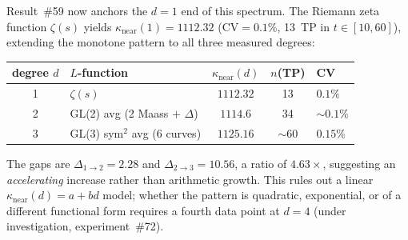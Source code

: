 \documentclass[11pt, a4paper]{article}
\theoremstyle{definition}
\theoremstyle{plain}
\begin{document}
Result~\#59 now anchors the $d{=}1$ end of this spectrum.
The Riemann zeta function $\zeta(s)$ yields $\kappa_{\mathrm{near}}(1) = 1112.32$
(CV${=}0.1\%$, 13~TP in $t \in [10,60]$), extending the monotone pattern to all
three measured degrees:

\smallskip
\begin{center}
\small
\begin{tabular}{clccl}
\toprule
degree $d$ & $L$-function & $\kappa_{\mathrm{near}}(d)$ & $n$(TP) & CV \\
\midrule
1 & $\zeta(s)$ & $1112.32$ & 13 & $0.1\%$ \\
2 & GL(2) avg (2 Maass $+$ $\Delta$) & $1114.6$ & 34 & ${\sim}0.1\%$ \\
3 & GL(3) sym$^2$ avg (6 curves) & $1125.16$ & ${\sim}60$ & $0.15\%$ \\
\bottomrule
\end{tabular}
\end{center}
\smallskip

\noindent
The gaps are $\Delta_{1\to2} = 2.28$ and $\Delta_{2\to3} = 10.56$, a ratio of $4.63\times$,
suggesting an \emph{accelerating} increase rather than arithmetic growth.
This rules out a linear $\kappa_{\mathrm{near}}(d) = a + bd$ model;
whether the pattern is quadratic, exponential, or of a different functional form
requires a fourth data point at $d{=}4$ (under investigation, experiment~\#72).
\end{document}
